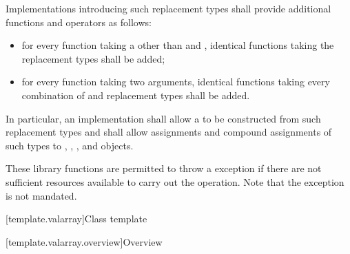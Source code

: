 \pnum
Implementations introducing such replacement types shall provide
additional functions and operators as follows:
\begin{itemize}
\item
for every function taking a
 other than  and
,
identical functions taking the replacement types shall be added;
\item
for every function taking two
arguments, identical functions taking every combination of
and replacement types shall be added.
\end{itemize}

\pnum
In particular, an implementation shall allow a
to be constructed from such replacement types and shall allow assignments
and compound assignments of such types to
,
,
,
and
objects.

\pnum
These library functions are permitted to throw a
 exception if there are not sufficient resources available
to carry out the operation.
Note that the exception is not mandated.

[template.valarray]{Class template }

[template.valarray.overview]{Overview}

